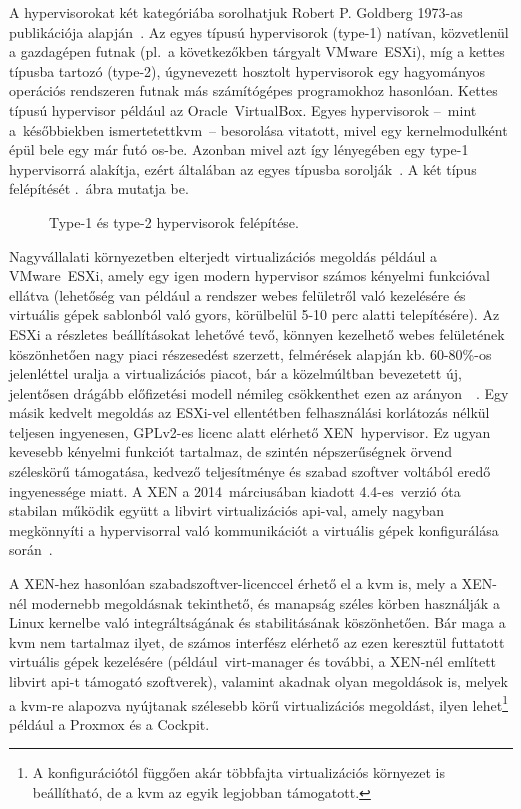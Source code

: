 A \gls{hypervisor}okat két kategóriába sorolhatjuk Robert P. Goldberg 1973-as publikációja alapján~\cite{Goldberg1973Hypervisors}. Az egyes típusú hypervisorok \mbox{(type-1)} natívan, közvetlenül a gazdagépen futnak (pl.~a következőkben tárgyalt VMware~ESXi), míg a kettes típusba tartozó \mbox{(type-2)}, úgynevezett hosztolt hypervisorok egy hagyományos operációs rendszeren futnak más számítógépes programokhoz hasonlóan. Kettes típusú hypervisor például az Oracle~\mbox{VirtualBox}. Egyes hypervisorok --~mint a~későbbiekben ismertetett\acrshort{kvm}~-- besorolása vitatott, mivel egy kernelmodulként épül bele egy már futó \acrshort{os}-be. Azonban mivel azt így lényegében egy type-1 \gls{hypervisor}rá alakítja, ezért általában az egyes típusba sorolják~\cite{WikiHypervisor}. A két típus felépítését .~ábra mutatja be.

\begin{figure}[ht]
	\centering
	
	\caption{Type-1 és type-2 \gls{hypervisor}ok felépítése.}
	\label{fig:hypervisors}
\end{figure}

Nagyvállalati környezetben elterjedt virtualizációs megoldás például a VMware~ESXi, amely egy igen modern \gls{hypervisor} számos kényelmi funkcióval ellátva (lehetőség van például a rendszer webes felületről való kezelésére és virtuális gépek sablonból való gyors, körülbelül 5-10 perc alatti telepítésére). Az ESXi a részletes beállításokat lehetővé tevő, könnyen kezelhető webes felületének köszönhetően nagy piaci részesedést szerzett, felmérések alapján kb. 60-80\%-os jelenléttel uralja a virtualizációs piacot, bár a közelmúltban bevezetett új, jelentősen drágább előfizetési modell némileg csökkenthet ezen az arányon~\cite{VmwareMarketshare}~\cite{VmwareCustomerDecline}.
Egy másik kedvelt megoldás az ESXi-vel ellentétben felhasználási korlátozás nélkül teljesen ingyenesen, GPLv2-es licenc alatt elérhető XEN~\gls{hypervisor}. Ez ugyan kevesebb kényelmi funkciót tartalmaz, de szintén népszerűségnek örvend széleskörű támogatása, kedvező teljesítménye és szabad szoftver voltából eredő ingyenessége miatt. A XEN a 2014~márciusában kiadott 4.4-es~verzió óta stabilan működik együtt a \gls{libvirt} virtualizációs \acrshort{api}-val, amely nagyban megkönnyíti a \gls{hypervisor}ral való kommunikációt a virtuális gépek konfigurálása során~\cite{Xen44ReleaseNotes}.

A XEN-hez hasonlóan szabadszoftver-licenccel érhető el a \acrfull{kvm} is, mely a XEN-nél modernebb megoldásnak tekinthető, és manapság széles körben használják a Linux kernelbe való integráltságának és stabilitásának köszönhetően. Bár maga a \acrshort{kvm} nem tartalmaz ilyet, de számos interfész elérhető az ezen keresztül futtatott virtuális gépek kezelésére (például~virt-manager és további, a XEN-nél említett \gls{libvirt} \acrshort{api}-t támogató  szoftverek), valamint akadnak olyan megoldások is, melyek a \acrshort{kvm}-re alapozva nyújtanak szélesebb körű virtualizációs megoldást, ilyen lehet\footnote{A konfigurációtól függően akár többfajta virtualizációs környezet is beállítható, de a \acrshort{kvm} az egyik legjobban támogatott.} például a Proxmox és a Cockpit.

